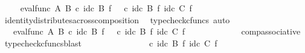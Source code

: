 \begin{isabellebody}
\ \isamarkupfalse%
\ {\isachardoublequoteopen}{\isachardot}{\kern0pt}{\isachardot}{\kern0pt}{\isachardot}{\kern0pt}\ {\isacharequal}{\kern0pt}\ eval{\isacharunderscore}{\kern0pt}func\ A\ B\ {\isasymcirc}\isactrlsub c\ {\isacharparenleft}{\kern0pt}{\isacharparenleft}{\kern0pt}id\isactrlsub c\ B\ {\isasymtimes}\isactrlsub f\ {\isasymphi}\isactrlsup {\isasymsharp}{\isacharparenright}{\kern0pt}\ \ {\isasymcirc}\isactrlsub c\ {\isacharparenleft}{\kern0pt}id\isactrlsub c\ B\ {\isasymtimes}\isactrlsub f\ {\isacharparenleft}{\kern0pt}id\isactrlsub c\ C\ {\isasymtimes}\isactrlsub f\ {\isasympsi}\isactrlsup {\isasymsharp}{\isacharparenright}{\kern0pt}{\isacharparenright}{\kern0pt}{\isacharparenright}{\kern0pt}{\isachardoublequoteclose}\isanewline
\ \ \ \ \ \ \ \ \ \ \isamarkupfalse%
\ identity{\isacharunderscore}{\kern0pt}distributes{\isacharunderscore}{\kern0pt}across{\isacharunderscore}{\kern0pt}composition\ \isamarkupfalse%
\ {\isacharparenleft}{\kern0pt}typecheck{\isacharunderscore}{\kern0pt}cfuncs{\isacharcomma}{\kern0pt}\ auto{\isacharparenright}{\kern0pt}\isanewline
\ \ \ \ \ \ \ \ \isamarkupfalse%
\ \isamarkupfalse%
\ {\isachardoublequoteopen}{\isachardot}{\kern0pt}{\isachardot}{\kern0pt}{\isachardot}{\kern0pt}\ {\isacharequal}{\kern0pt}\ {\isacharparenleft}{\kern0pt}eval{\isacharunderscore}{\kern0pt}func\ A\ B\ {\isasymcirc}\isactrlsub c\ {\isacharparenleft}{\kern0pt}{\isacharparenleft}{\kern0pt}id\isactrlsub c\ B\ {\isasymtimes}\isactrlsub f\ {\isasymphi}\isactrlsup {\isasymsharp}{\isacharparenright}{\kern0pt}{\isacharparenright}{\kern0pt}{\isacharparenright}{\kern0pt}\ \ {\isasymcirc}\isactrlsub c\ {\isacharparenleft}{\kern0pt}id\isactrlsub c\ B\ {\isasymtimes}\isactrlsub f\ {\isacharparenleft}{\kern0pt}id\isactrlsub c\ C\ {\isasymtimes}\isactrlsub f\ {\isasympsi}\isactrlsup {\isasymsharp}{\isacharparenright}{\kern0pt}{\isacharparenright}{\kern0pt}{\isachardoublequoteclose}\isanewline
\ \ \ \ \ \ \ \ \ \ \isamarkupfalse%
\ comp{\isacharunderscore}{\kern0pt}associative{}\ \isamarkupfalse%
\ {\isacharparenleft}{\kern0pt}typecheck{\isacharunderscore}{\kern0pt}cfuncs{\isacharcomma}{\kern0pt}blast{\isacharparenright}{\kern0pt}\isanewline
\ \ \ \ \ \ \ \ \isamarkupfalse%
\ \isamarkupfalse%
\ {\isachardoublequoteopen}{\isachardot}{\kern0pt}{\isachardot}{\kern0pt}{\isachardot}{\kern0pt}\ {\isacharequal}{\kern0pt}\ {\isasymphi}\ \ {\isasymcirc}\isactrlsub c\ {\isacharparenleft}{\kern0pt}id\isactrlsub c\ B\ {\isasymtimes}\isactrlsub f\ {\isacharparenleft}{\kern0pt}id\isactrlsub c\ C\ {\isasymtimes}\isactrlsub f\ {\isasympsi}\isactrlsup {\isasymsharp}{\isacharparenright}{\kern0pt}{\isacharparenright}{\kern0pt}{\isachardoublequoteclose}\isanewline

\end{isabellebody}
